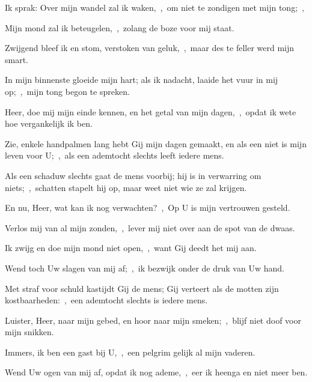 \documentclass[12pt,twoside,a5paper]{article}
\begin{document}


\begin{halfparskip}
  Ik sprak: Over mijn wandel zal ik waken,~\sep\ om niet te zondigen met mijn tong;~\sep

  Mijn mond zal ik beteugelen,~\sep\ zolang de boze voor mij staat.


  Zwijgend bleef ik en stom, verstoken van geluk,~\sep\ maar des te feller werd mijn smart.

  In mijn binnenste gloeide mijn hart; als ik nadacht, laaide het vuur in mij op;~\sep\ mijn tong begon te spreken.
\end{halfparskip}


\begin{halfparskip}
  Heer, doe mij mijn einde kennen, en het getal van mijn dagen,~\sep\ opdat ik wete hoe vergankelijk ik ben.

  Zie, enkele handpalmen lang hebt Gij mijn dagen gemaakt, en als een niet is mijn leven voor U;~\sep\ als een ademtocht slechts leeft iedere mens.

  Als een schaduw slechts gaat de mens voorbij; hij is in verwarring om niets;~\sep\ schatten stapelt hij op, maar weet niet wie ze zal krijgen.
\end{halfparskip}


\begin{halfparskip}
  En nu, Heer, wat kan ik nog verwachten?~\sep\ Op U is mijn vertrouwen gesteld.

  Verlos mij van al mijn zonden,~\sep\ lever mij niet over aan de spot van de dwaas.

  Ik zwijg en doe mijn mond niet open,~\sep\ want Gij deedt het mij aan.

  Wend toch Uw slagen van mij af;~\sep\ ik bezwijk onder de druk van Uw hand.

  Met straf voor schuld kastijdt Gij de mens; Gij verteert als de motten zijn kostbaarheden:~\sep\ een ademtocht slechts is iedere mens.

  Luister, Heer, naar mijn gebed, en hoor naar mijn smeken;~\sep\ blijf niet doof voor mijn snikken.

  Immers, ik ben een gast bij U,~\sep\ een pelgrim gelijk al mijn vaderen.

  Wend Uw ogen van mij af, opdat ik nog ademe,~\sep\ eer ik heenga en niet meer ben.
\end{halfparskip}
\end{document}
